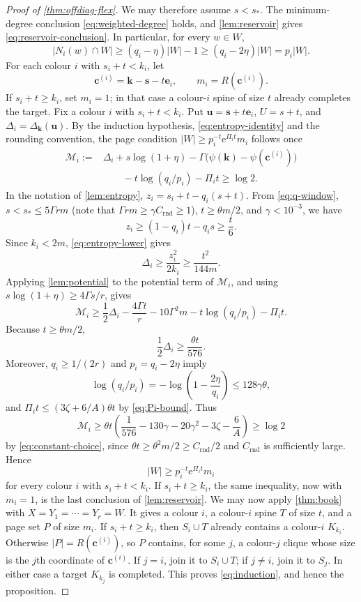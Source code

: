 \documentclass[11pt]{article}
\theoremstyle{definition}
\newcommand{\e}{\mathrm e}
\newcommand{\kk}{\mathbf k}
\newcommand{\uu}{\mathbf u}
\newcommand{\ssv}{\mathbf s}
\newcommand{\cc}{\mathbf c}
\newcommand{\ee}{\mathbf e}
\newcommand{\DG}{\Delta}
\newcommand{\pot}{\psi}
\begin{document}
\begin{proof}[Proof of \cref{thm:offdiag-flex}]
We may therefore assume $s<s_\ast$.  The minimum-degree conclusion
\eqref{eq:weighted-degree} holds, and \cref{lem:reservoir} gives
\eqref{eq:reservoir-conclusion}.  In particular, for every $w\in W$,
\[
 |N_i(w)\cap W|
 \ge(q_i-\eta)|W|-1
 \ge(q_i-2\eta)|W|=p_i|W|.
\]
For each colour $i$ with $s_i+t<k_i$, let
\[
 \cc^{(i)}=\kk-\ssv-t\ee_i,
 \qquad m_i=R(\cc^{(i)}).
\]
If $s_i+t\ge k_i$, set $m_i=1$; in that case a colour-$i$ spine of size
$t$ already completes the target.
Fix a colour $i$ with $s_i+t<k_i$.  Put
$\uu=\ssv+t\ee_i$, $U=s+t$, and
$\DG_i=\DG_{\kk}(\uu)$.  By the induction hypothesis,
\eqref{eq:entropy-identity} and the rounding convention, the page condition
$|W|\ge p_i^{-t}\e^{\Pi_it}m_i$ follows once
\begin{align*}
 \mathcal M_i:={}&
 \DG_i+s\log(1+\eta)
 -\Gamma\bigl(\pot(\kk)-\pot(\cc^{(i)})\bigr)\\
 &\qquad -t\log(q_i/p_i)-\Pi_it\ge\log2.
\end{align*}
In the notation of \cref{lem:entropy}, $z_i=s_i+t-q_i(s+t)$.  From
\eqref{eq:q-window},
$s<s_\ast\le5\Gamma rm$ (note that $\Gamma rm\ge\gamma C_{\mathrm{rnd}}\ge1$),
$t\ge\theta m/2$, and $\gamma<10^{-3}$, we have
\[
 z_i\ge(1-q_i)t-q_is\ge\frac t6.
\]
Since $k_i<2m$, \eqref{eq:entropy-lower} gives
\[
 \DG_i\ge\frac{z_i^2}{2k_i}\ge\frac{t^2}{144m}.
\]
Applying \cref{lem:potential} to the potential term of $\mathcal M_i$, and
using $s\log(1+\eta)\ge4\Gamma s/r$, gives
\[
 \mathcal M_i\ge
 \frac12\DG_i-\frac{4\Gamma t}{r}-10\Gamma^2m
 -t\log(q_i/p_i)-\Pi_it.
\]
Because $t\ge\theta m/2$,
\[
 \frac12\DG_i\ge\frac{\theta t}{576}.
\]
Moreover, $q_i\ge1/(2r)$ and $p_i=q_i-2\eta$ imply
\[
 \log(q_i/p_i)
 =-\log\left(1-\frac{2\eta}{q_i}\right)
 \le128\gamma\theta,
\]
and $\Pi_it\le(3\zeta+6/A)\theta t$ by \eqref{eq:Pi-bound}.  Thus
\begin{equation}\label{eq:page-positive}
 \mathcal M_i\ge
 \theta t\left(
 \frac1{576}-130\gamma-20\gamma^2-3\zeta-\frac6A
 \right)\ge\log2
\end{equation}
by \eqref{eq:constant-choice}, since
$\theta t\ge\theta^2m/2\ge C_{\mathrm{rnd}}/2$ and $C_{\mathrm{rnd}}$ is
sufficiently large.  Hence
\[
 |W|\ge p_i^{-t}\e^{\Pi_it}m_i
\]
for every colour $i$ with $s_i+t<k_i$.  If $s_i+t\ge k_i$, the same
inequality, now with $m_i=1$, is the last conclusion of \cref{lem:reservoir}.
We may now apply \cref{thm:book} with
$X=Y_1=\cdots=Y_r=W$.  It gives a colour $i$, a colour-$i$ spine $T$ of size
$t$, and a page set $P$ of size $m_i$.  If $s_i+t\ge k_i$, then
$S_i\cup T$ already contains a colour-$i$ $K_{k_i}$.  Otherwise
$|P|=R(\cc^{(i)})$, so $P$ contains, for some $j$, a colour-$j$ clique
whose size is the $j$th coordinate of $\cc^{(i)}$.  If $j=i$, join it to
$S_i\cup T$; if $j\ne i$,
join it to $S_j$.  In either case a target $K_{k_j}$ is completed.  This
proves \eqref{eq:induction}, and hence the proposition.
\end{proof}
\end{document}
